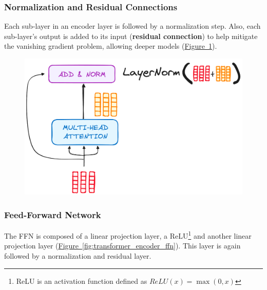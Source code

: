 \documentclass[12pt]{article}
\begin{document}
\subsubsection{Normalization and Residual Connections}
\label{subsubsec:transformer_normalization_layer}
Each sub-layer in an encoder layer is followed by a normalization step. Also, each sub-layer's output is 
added to its input (\textbf{residual connection}) to help mitigate the vanishing gradient problem, allowing deeper 
models (\hyperref[fig:transformer_encoder_add_residual]{Figure~\ref*{fig:transformer_encoder_add_residual}}). 

\begin{figure}
    \centering
    \includegraphics[width=.4\textwidth]{Images/transformer_encoder_add_residual.png}
    \caption{}
    \label{fig:transformer_encoder_add_residual}
\end{figure}

\subsubsection{Feed-Forward Network}
\label{subsubsec:transformer_encoder_feed_forward}
The FFN is composed of a linear projection layer, a ReLU\footnote{ReLU is an activation function defined 
as $ReLU(x) = \max(0, x)$} and another linear projection layer 
(\hyperref[fig:transformer_encoder_ffn]{Figure~\ref*{fig:transformer_encoder_ffn}}). This layer is again 
followed by a normalization and residual layer.
\end{document}
